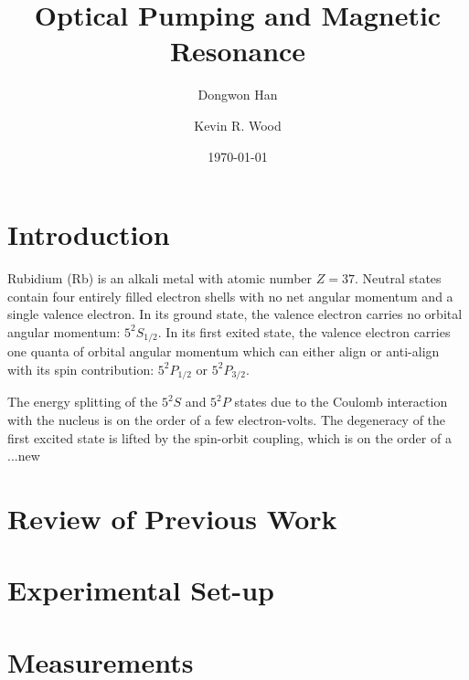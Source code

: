 \documentclass[aps,prl,twocolumn,groupedaddress]{revtex4-1}
\begin{document}
\title{Optical Pumping and Magnetic Resonance}
\author{Dongwon Han}
\author{Kevin R. Wood}


\date{\today}

\begin{abstract}
\end{abstract}

\maketitle

\section{Introduction}
Rubidium (Rb) is an alkali metal with atomic number $Z=37$.
Neutral states contain four entirely filled electron shells with no net angular momentum and a single valence electron.
In its ground state, the valence electron carries no orbital angular momentum: $5^{2}S_{1/2}$.
In its first exited state, the valence electron carries one quanta of orbital angular momentum which can either align or anti-align with its spin contribution: $5^{2}P_{1/2}$ or $5^{2}P_{3/2}$. %

The energy splitting of the $5^{2}S$ and $5^{2}P$ states due to the Coulomb interaction with the nucleus is on the order of a few electron-volts.  The degeneracy of the first excited state is lifted by the spin-orbit coupling, which is on the order of a ...new

\section{Review of Previous Work}
\section{Experimental Set-up}
\section{Measurements}
\end{document}
